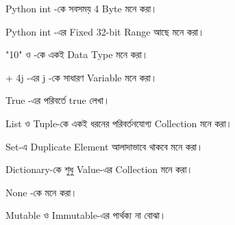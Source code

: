 \begin{compacttwocolpoints}

\item
Python
\textenglish{\ttfamily int}
-কে সবসময় 4 Byte মনে করা।

\item
Python
\textenglish{\ttfamily int}
-এর Fixed 32-bit Range আছে মনে করা।

\item
\textenglish{\ttfamily "10"}
ও
\textenglish{}
-কে একই Data Type মনে করা।

\item
\textenglish{ + 4j}
-এর
\textenglish{\ttfamily j}
-কে সাধারণ Variable মনে করা।

\item
\textenglish{\ttfamily True}
-এর পরিবর্তে
\textenglish{\ttfamily true}
লেখা।

\item List ও Tuple-কে একই ধরনের পরিবর্তনযোগ্য Collection মনে করা।

\item Set-এ Duplicate Element আলাদাভাবে থাকবে মনে করা।

\item Dictionary-কে শুধু Value-এর Collection মনে করা।

\item
\textenglish{\ttfamily None}
-কে
\textenglish{}
মনে করা।

\item Mutable ও Immutable-এর পার্থক্য না বোঝা।

\end{compacttwocolpoints}


